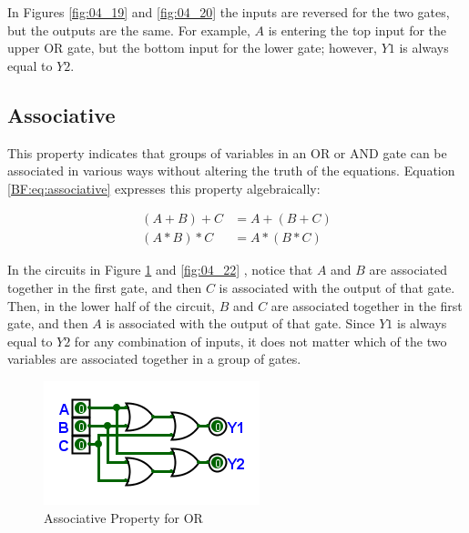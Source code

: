 In Figures \ref{fig:04_19} and \ref{fig:04_20} the inputs are reversed for the two gates, but the outputs are the same. For example, $ A $ is entering the top input for the upper \textsf{OR} gate, but the bottom input for the lower gate; however, $ Y1 $ is always equal to $ Y2 $.

\subsection{Associative}
\label{BF:subsec:associative_property}


This property indicates that groups of variables in an \textsf{OR} or \textsf{AND} gate can be associated in various ways without altering the truth of the equations. Equation \ref{BF:eq:associative} expresses this property algebraically: 

\begin{align}
  \label{BF:eq:associative}
  ( A + B ) + C &= A + ( B + C ) \\
  \nonumber
  ( A * B ) * C &= A * ( B * C )
\end{align}


In the circuits in Figure \ref{fig:04_21} and \ref{fig:04_22} , notice that $ A $ and $ B $ are associated together in the first gate, and then $ C $ is associated with the output of that gate. Then, in the lower half of the circuit, $ B $ and $ C $ are associated together in the first gate, and then $ A $ is associated with the output of that gate. Since $ Y1 $ is always equal to $ Y2 $ for any combination of inputs, it does not matter which of the two variables are associated together in a group of gates.  

\begin{figure}[H]
	\centering
	\includegraphics[width=\maxwidth{.95\linewidth}]{gfx/04_21}
	\caption{Associative Property for OR}
	\label{fig:04_21}
\end{figure}

